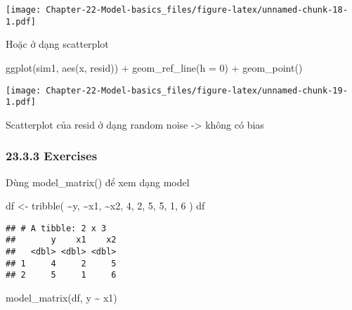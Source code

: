 \documentclass[
]{article}
\newenvironment{Shaded}{\begin{snugshade}}{\end{snugshade}}
\newcommand{\AttributeTok}[1]{\textcolor[rgb]{0.77,0.63,0.00}{#1}}
\newcommand{\DecValTok}[1]{\textcolor[rgb]{0.00,0.00,0.81}{#1}}
\newcommand{\FunctionTok}[1]{\textcolor[rgb]{0.00,0.00,0.00}{#1}}
\newcommand{\NormalTok}[1]{#1}
\newcommand{\OtherTok}[1]{\textcolor[rgb]{0.56,0.35,0.01}{#1}}
\newcommand{\SpecialCharTok}[1]{\textcolor[rgb]{0.00,0.00,0.00}{#1}}
\begin{document}
\texttt{[image: Chapter-22-Model-basics\_files/figure-latex/unnamed-chunk-18-1.pdf]}

Hoặc ở dạng scatterplot

\begin{Shaded}
\begin{Highlighting}[]
\FunctionTok{ggplot}\NormalTok{(sim1, }\FunctionTok{aes}\NormalTok{(x, resid)) }\SpecialCharTok{+} 
  \FunctionTok{geom\_ref\_line}\NormalTok{(}\AttributeTok{h =} \DecValTok{0}\NormalTok{) }\SpecialCharTok{+}
  \FunctionTok{geom\_point}\NormalTok{() }
\end{Highlighting}
\end{Shaded}

\texttt{[image: Chapter-22-Model-basics\_files/figure-latex/unnamed-chunk-19-1.pdf]}

Scatterplot của resid ở dạng random noise -\textgreater{} không có bias

\hypertarget{exercises}{%
\subsubsection{23.3.3 Exercises}\label{exercises}}

Dùng model\_matrix() để xem dạng model

\begin{Shaded}
\begin{Highlighting}[]
\NormalTok{df }\OtherTok{\textless{}{-}} \FunctionTok{tribble}\NormalTok{(}
  \SpecialCharTok{\textasciitilde{}}\NormalTok{y, }\SpecialCharTok{\textasciitilde{}}\NormalTok{x1, }\SpecialCharTok{\textasciitilde{}}\NormalTok{x2,}
  \DecValTok{4}\NormalTok{, }\DecValTok{2}\NormalTok{, }\DecValTok{5}\NormalTok{,}
  \DecValTok{5}\NormalTok{, }\DecValTok{1}\NormalTok{, }\DecValTok{6}
\NormalTok{)}
\NormalTok{df}
\end{Highlighting}
\end{Shaded}

\begin{verbatim}
## # A tibble: 2 x 3
##       y    x1    x2
##   <dbl> <dbl> <dbl>
## 1     4     2     5
## 2     5     1     6
\end{verbatim}

\begin{Shaded}
\begin{Highlighting}[]
\FunctionTok{model\_matrix}\NormalTok{(df, y }\SpecialCharTok{\textasciitilde{}}\NormalTok{ x1)}
\end{Highlighting}
\end{Shaded}
\end{document}
